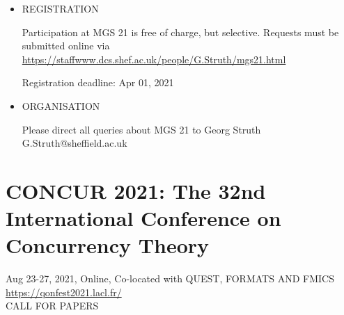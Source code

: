 \documentclass{article}
\begin{document}
\begin{itemize}
\item  REGISTRATION 
 
  Participation at MGS 21 is free of charge, but selective. Requests must be submitted online via \href{https://staffwww.dcs.shef.ac.uk/people/G.Struth/mgs21.html}{https://staffwww.dcs.shef.ac.uk/people/G.Struth/mgs21.html} 
 
Registration deadline: Apr 01, 2021 
 
\item  ORGANISATION 
 
  Please direct all queries about MGS 21 to Georg Struth G.Struth@sheffield.ac.uk 
 
\end{itemize}\section{CONCUR 2021: The 32nd International Conference on Concurrency Theory}\label{CONCUR2021}  Aug 23-27, 2021, Online, Co-located with QUEST, FORMATS AND FMICS\\ 
  \href{https://qonfest2021.lacl.fr/}{https://qonfest2021.lacl.fr/}\\ 
CALL FOR PAPERS 
\end{document}
